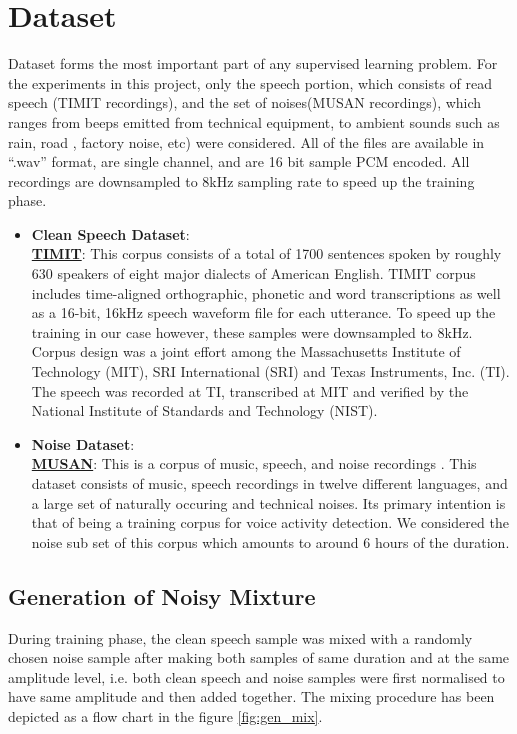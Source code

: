 \section{Dataset}
Dataset forms the most important part of any supervised learning problem. For the experiments in this project, only the speech portion, which consists of read speech (TIMIT recordings), and the set of noises(MUSAN recordings), which ranges from beeps emitted from technical equipment, to ambient sounds such as rain, road , factory noise, etc) were considered. All of the files are available in \enquote{.wav} format, are single channel, and are 16 bit sample PCM encoded. All recordings are downsampled to 8kHz sampling rate to speed up the training phase.

\begin{itemize}
\item \textbf{Clean Speech Dataset}:\\
\textbf{\href{http://www.ldc.upenn.edu/Catalog/CatalogEntry.jsp?catalogId=LDC93S1}{TIMIT}}: This corpus \cite{ref:timit} consists of a total of 1700 sentences spoken by roughly 630 speakers of eight major dialects of American English. TIMIT corpus includes time-aligned orthographic, phonetic and word transcriptions as well as a 16-bit, 16kHz speech waveform file for each utterance. To speed up the training in our case however, these samples were downsampled to 8kHz. Corpus design was a joint effort among the Massachusetts Institute of Technology (MIT), SRI International (SRI) and Texas Instruments, Inc. (TI). The speech was recorded at TI, transcribed at MIT and verified by the National Institute of Standards and Technology (NIST).
\item \textbf{Noise Dataset}:\\
\textbf{\href{https://www.openslr.org/17/}{MUSAN}}: This is a corpus of music, speech, and noise recordings \cite{ref:musan2015}. This dataset consists of music, speech recordings in twelve different languages, and a large set of naturally occuring and technical noises. Its primary intention is that of being a training corpus for voice activity detection. We considered the noise sub set of this corpus which amounts to around 6 hours of the duration.
\end{itemize}

\subsection{Generation of Noisy Mixture}
During training phase, the clean speech sample was mixed with a randomly chosen noise sample after making both samples of same duration and at the same amplitude level, i.e. both clean speech and noise samples were first normalised to have same amplitude and then added together. The mixing procedure has been depicted as a flow chart in the figure \ref{fig:gen_mix}.

